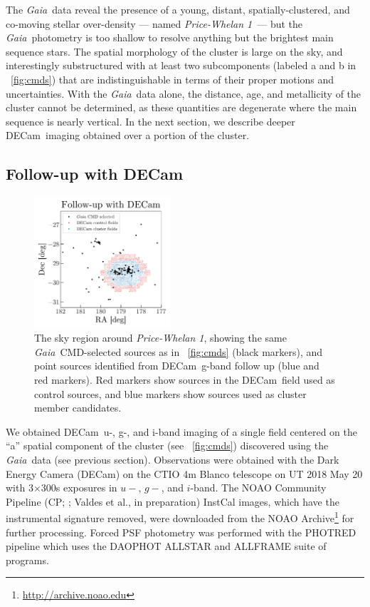 \documentclass[twocolumn]{aastex62}
\newcommand{\gaia}{\textsl{Gaia}}
\newcommand{\decam}{DECam}
\newcommand{\clustername}{\textsl{Price-Whelan 1}}
\begin{document}
The \gaia\ data reveal the presence of a young, distant, spatially-clustered, and co-moving stellar over-density --- named \clustername\ --- but the \gaia\ photometry is too shallow to resolve anything but the brightest main sequence stars.
The spatial morphology of the cluster is large on the sky, and interestingly substructured with at least two subcomponents (labeled a and b in \figurename~\ref{fig:cmds}) that are indistinguishable in terms of their proper motions and uncertainties.
With the \gaia\ data alone, the distance, age, and metallicity of the cluster  cannot be determined, as these quantities are degenerate where the main sequence is nearly vertical.
In the next section, we describe deeper \decam\ imaging obtained over a portion of the cluster.

\subsection{Follow-up with \decam}
\label{sec:decam}

\begin{figure}[t!]
\centering
\includegraphics[width=0.45\textwidth]{figures/DECam-field.pdf}
\caption{The sky region around \clustername, showing the same \gaia\ CMD-selected sources as in \figurename~\ref{fig:cmds} (black markers), and point sources identified from \decam\ g-band follow up (blue and red markers).
Red markers show sources in the \decam\ field used as control sources, and blue markers show sources used as cluster member candidates.}
\label{fig:decam-field}
\end{figure}

We obtained \decam\ u-, g-, and i-band imaging of a single field centered on the ``a'' spatial component of the cluster (see \figurename~\ref{fig:cmds}) discovered using the \gaia\ data (see previous section).  Observations were obtained with the Dark Energy Camera (DECam) on the CTIO 4m Blanco telescope on UT 2018 May 20 with 3$\times$300s
exposures in $u-$, $g-$, and $i$-band.  The NOAO Community Pipeline (CP; \citealt{Valdes:2014}; Valdes et al., in preparation) InstCal images, which have the instrumental signature removed, were downloaded from the NOAO Archive\footnote{\url{http://archive.noao.edu}} for further processing.  Forced PSF photometry was performed with the PHOTRED pipeline \citep{Nidever:2017} which uses the DAOPHOT ALLSTAR \citep{Stetson:1987} and ALLFRAME \citep{Stetson:1994} suite of programs.
\end{document}
